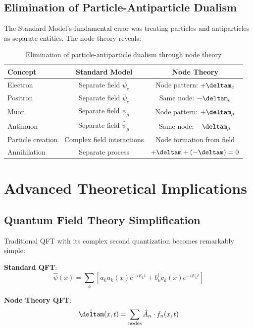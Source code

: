 	\subsection{Elimination of Particle-Antiparticle Dualism}
	
	The Standard Model's fundamental error was treating particles and antiparticles as separate entities. The node theory reveals:
	
	\begin{table}[htbp]
		\centering
		\begin{tabular}{lcc}
			\toprule
			\textbf{Concept} & \textbf{Standard Model} & \textbf{Node Theory} \\
			\midrule
			Electron & Separate field $\psi_e$ & Node pattern: $+\deltam_e$ \\
			Positron & Separate field $\bar{\psi}_e$ & Same node: $-\deltam_e$ \\
			Muon & Separate field $\psi_{\mu}$ & Node pattern: $+\deltam_{\mu}$ \\
			Antimuon & Separate field $\bar{\psi}_{\mu}$ & Same node: $-\deltam_{\mu}$ \\
			Particle creation & Complex field interactions & Node formation from field \\
			Annihilation & Separate process & $+\deltam + (-\deltam) = 0$ \\
			\bottomrule
		\end{tabular}
		\caption{Elimination of particle-antiparticle dualism through node theory}
		\label{tab:node_theory_comparison}
	\end{table}
	
	\section{Advanced Theoretical Implications}
	
	\subsection{Quantum Field Theory Simplification}
	
	Traditional QFT with its complex second quantization becomes remarkably simple:
	
	\textbf{Standard QFT}:
	\begin{equation}
		\hat{\psi}(x) = \sum_k \left[ a_k u_k(x) e^{-iE_k t} + b_k^\dagger v_k(x) e^{+iE_k t} \right]
	\end{equation}
	
	\textbf{Node Theory QFT}:
	\begin{equation}
		\hat{\deltam}(x,t) = \sum_{\text{nodes}} \hat{A}_n \cdot f_n(x,t)
	\end{equation}
	
